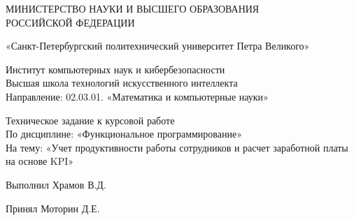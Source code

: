 \documentclass[a4paper, 14pt]{extarticle} %
\begin{document}
    \begin{titlepage}
        \thispagestyle{empty}
        
        \begin{center}
        
            { \large МИНИСТЕРСТВО НАУКИ И ВЫСШЕГО ОБРАЗОВАНИЯ \\ 
                РОССИЙСКОЙ ФЕДЕРАЦИИ }
             
            { «Санкт-Петербургский политехнический университет Петра Великого» }
            
            { Институт компьютерных наук и кибербезопасности \\ 
                Высшая школа технологий искусственного интеллекта \\
                Направление: 02.03.01. «Математика и компьютерные науки» \\ }        
              
              \vspace{3cm}
            { \large Техническое задание к курсовой работе \\ 
              По дисциплине: «Функциональное программирование» \\ 
              На тему: «Учет продуктивности работы сотрудников и расчет заработной платы на основе KPI»}
    
        \end{center}
    
        \vspace{3cm}

        \begin{center}
            \noindent
            \begin{minipage}[t]{\textwidth}
                \raggedright Выполнил \hfill 
                \underline{\hspace{3cm}} Храмов В.Д.
            \end{minipage}
            
            \vspace{1cm}
            
            \noindent
            \begin{minipage}[t]{\textwidth}
                \raggedright Принял \hfill 
                \underline{\hspace{3cm}} Моторин Д.Е.
            \end{minipage}
        \end{center}
        

\end{titlepage}
\end{document}
